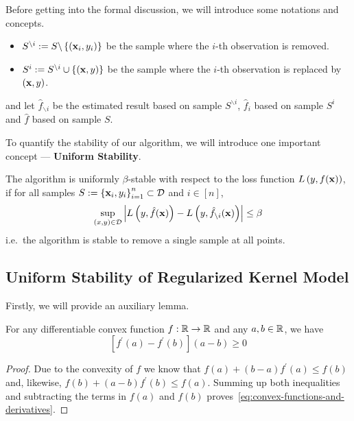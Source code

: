 \noindent Before getting into the formal discussion, we will introduce some notations and concepts.
\begin{itemize}
	\item \(S^{\backslash i}:=S\backslash\left\{(\mathbf{x}_{i},y_{i})\right\}\) be the sample where the \(i\)-th observation is removed.
	\item \(S^{i}:=S^{\backslash i}\cup\{(\mathbf{x},y)\}\) be the sample where the \(i\)-th observation is replaced by \((\mathbf{x},y)\).
\end{itemize}
and let \(\hat{f}_{\backslash i}\) be the estimated result based on sample \(S^{\backslash i}\), \(\hat{f}_{i}\) based on sample \(S^{i}\) and \(\hat{f}\) based on sample \(S\).

To quantify the stability of our algorithm, we will introduce one important concept --- \textbf{Uniform Stability}.
\begin{definition}\label{def:uniform-stability}
	The algorithm is uniformly \(\beta\)-stable with respect to the loss function \(L\left(y,f(\mathbf{x})\right)\), if for all samples \(S:=\left\{\mathbf{x}_{i},y_{i}\right\}_{i=1}^{n}\subset\mathcal{D}\) and \(i\in[n]\),
	\begin{equation}
		\sup_{(x,y)\in\mathcal{D}}\left|L\left(y,\hat{f}(\mathbf{x})\right)-L\left(y,\hat{f}_{\backslash i}(\mathbf{x})\right)\right|\leq\beta
	\end{equation}
	i.e.\ the algorithm is stable to remove a single sample at all points.
\end{definition}

\subsection{Uniform Stability of Regularized Kernel Model}

Firstly, we will provide an auxiliary lemma.

\begin{lemma}\label{lem:convex-functions-and-derivatives}
	For any differentiable convex function \(f:\mathbb{R}\rightarrow\mathbb{R}\) and any \(a,b\in\mathbb{R}\), we have
	\begin{equation}
		\label{eq:convex-functions-and-derivatives}
		\left[f^{\prime}(a)-f^{\prime}(b)\right](a-b)\geq 0
	\end{equation}
\end{lemma}

\begin{proof}
	Due to the convexity of \(f\) we know that \(f(a)+(b-a) f^{\prime}(a) \leq f(b)\) and, likewise, \(f(b)+(a-b) f^{\prime}(b) \leq f(a)\). Summing up both inequalities and subtracting the terms in \(f(a)\) and \(f(b)\) proves~\eqref{eq:convex-functions-and-derivatives}.
\end{proof}

